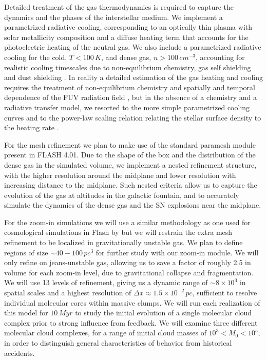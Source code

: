 \documentclass[12pt,a4paper]{article}
\begin{document}
Detailed treatment of the gas thermodynamics is required to capture the dynamics and the phases of the interstellar medium.
We implement a parametrized radiative cooling, corresponding to an optically thin plasma with solar metallicity composition \citep{Dalgarno&McCray1972, Sutherland&Dopita1993} and a diffuse heating term that accounts for the photoelectric heating \citep{Wolfire1995, Wolfire2003} of the neutral gas.
We also include a parametrized radiative cooling for the cold, $T < 100 \, K$, and dense gas, $n > 100 \, cm^{-3}$, accounting for realistic cooling timescales due to non-equilibrium chemistry, gas self shielding and dust shielding \citep{Gover&MacLow2007, Glover2010}.
In reality a detailed estimation of the gas heating and cooling requires the treatment of non-equilibrium chemistry and spatially and temporal dependence of the FUV radiation field \citep{Parravano2003}, but in the absence of a chemistry and a radiative transfer model, we resorted to the more simple parametrized cooling curves and to the power-law scaling relation relating the stellar surface density to the heating rate \citep{Joung2009}.

For the mesh refinement we plan to make use of the standard paramesh \citep{paramesh} module present in FLASH 4.01.
Due to the shape of the box and the distribution of the dense gas in the simulated volume, we implement a nested refinement structure, with the higher resolution around the midplane and lower resolution with increasing distance to the midplane.
Such nested criteria allow us to capture the evolution of the gas at altitudes in the galactic fountain, and to accurately simulate the dynamics of the dense gas and the SN explosions near the midplane.
	
For the zoom-in simulations we will use a similar methodology as one used for cosmological simulations in Flash by \citet{Sutter&Ricker2012} but we will restrain the extra mesh refinement to be localized in gravitationally unstable gas. 
We plan to define regions of size $\sim 40 - 100 \, pc^3$ for further study with our zoom-in module.
We will only refine on jeans-unstable gas, allowing us to save a factor of roughly 2.5 in volume for each zoom-in level, due to gravitational collapse and fragmentation.
We will use 13 levels of refinement, giving us a dynamic range of $\sim 8 \times 10^3$ in spatial scales and a highest resolution of $\Delta x \approx 1.5 \times 10^{-2} \, pc$, sufficient to resolve individual molecular cores within massive clumps.
We will run each realization of this model for $10 \, Myr$ to study the initial evolution of a single molecular cloud complex prior to strong influence from feedback. We will examine three different molecular cloud complexes, for a range of initial cloud masses of $10^{3} < M_{0} < 10^{5}$, in order to distinguish general characteristics of behavior from historical accidents.
	
\end{document}
